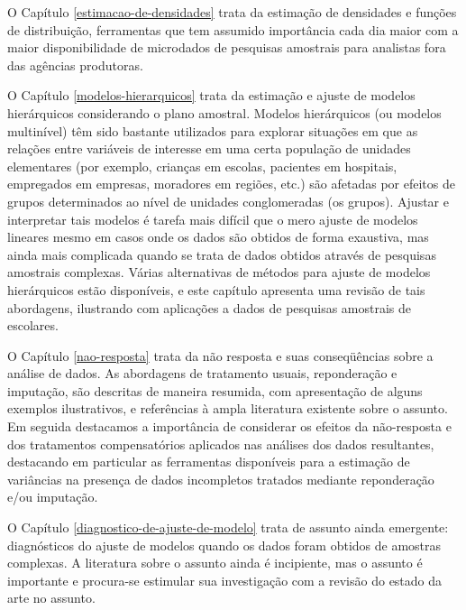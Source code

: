 \documentclass[]{book}
\theoremstyle{definition}
\theoremstyle{definition}
\theoremstyle{definition}
\theoremstyle{remark}
\begin{document}
O Capítulo \ref{estimacao-de-densidades} trata da estimação de
densidades e funções de distribuição, ferramentas que tem assumido
importância cada dia maior com a maior disponibilidade de microdados de
pesquisas amostrais para analistas fora das agências produtoras.

O Capítulo \ref{modelos-hierarquicos} trata da estimação e ajuste de
modelos hierárquicos considerando o plano amostral. Modelos hierárquicos
(ou modelos multinível) têm sido bastante utilizados para explorar
situações em que as relações entre variáveis de interesse em uma certa
população de unidades elementares (por exemplo, crianças em escolas,
pacientes em hospitais, empregados em empresas, moradores em regiões,
etc.) são afetadas por efeitos de grupos determinados ao nível de
unidades conglomeradas (os grupos). Ajustar e interpretar tais modelos é
tarefa mais difícil que o mero ajuste de modelos lineares mesmo em casos
onde os dados são obtidos de forma exaustiva, mas ainda mais complicada
quando se trata de dados obtidos através de pesquisas amostrais
complexas. Várias alternativas de métodos para ajuste de modelos
hierárquicos estão disponíveis, e este capítulo apresenta uma revisão de
tais abordagens, ilustrando com aplicações a dados de pesquisas
amostrais de escolares.

O Capítulo \ref{nao-resposta} trata da não resposta e suas conseqüências
sobre a análise de dados. As abordagens de tratamento usuais,
reponderação e imputação, são descritas de maneira resumida, com
apresentação de alguns exemplos ilustrativos, e referências à ampla
literatura existente sobre o assunto. Em seguida destacamos a
importância de considerar os efeitos da não-resposta e dos tratamentos
compensatórios aplicados nas análises dos dados resultantes, destacando
em particular as ferramentas disponíveis para a estimação de variâncias
na presença de dados incompletos tratados mediante reponderação e/ou
imputação.

O Capítulo \ref{diagnostico-de-ajuste-de-modelo} trata de assunto ainda
emergente: diagnósticos do ajuste de modelos quando os dados foram
obtidos de amostras complexas. A literatura sobre o assunto ainda é
incipiente, mas o assunto é importante e procura-se estimular sua
investigação com a revisão do estado da arte no assunto.
\end{document}
